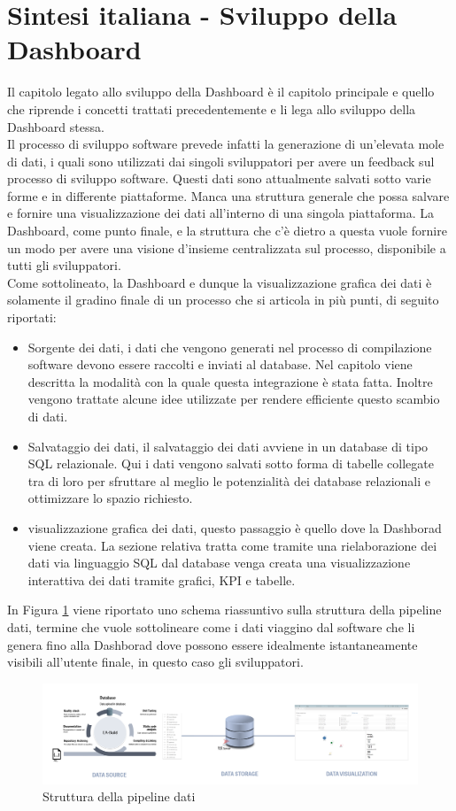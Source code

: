 \documentclass[../main.tex]{subfiles}
\begin{document}
\section{Sintesi italiana - Sviluppo della Dashboard}
Il capitolo legato allo sviluppo della Dashboard è il capitolo principale e quello che riprende i concetti trattati precedentemente  e li lega allo sviluppo della Dashboard stessa.\\
Il processo di sviluppo software prevede infatti la generazione di un'elevata mole di dati, i quali sono utilizzati dai singoli sviluppatori per avere un feedback sul processo di sviluppo software. Questi dati sono attualmente salvati sotto varie forme e in differente piattaforme. Manca una struttura generale che possa salvare e fornire una visualizzazione dei dati all'interno di una singola piattaforma. La Dashboard, come punto finale, e la struttura che c'è dietro a questa vuole fornire un modo per avere una visione d'insieme centralizzata sul processo, disponibile a tutti gli sviluppatori.\\
Come sottolineato, la Dashboard e dunque la visualizzazione grafica dei dati è solamente il gradino finale di un processo che si articola in più punti, di seguito riportati:
\begin{itemize}
    \item Sorgente dei dati, i dati che vengono generati nel processo di compilazione software devono essere raccolti e inviati al database. Nel capitolo viene descritta la modalità con la quale questa integrazione è stata fatta. Inoltre vengono trattate alcune idee utilizzate per rendere efficiente questo scambio di dati.
    \item Salvataggio dei dati, il salvataggio dei dati avviene in un database di tipo \gls{SQL} relazionale. Qui i dati vengono salvati sotto forma di tabelle collegate tra di loro per sfruttare al meglio le potenzialità dei database relazionali e ottimizzare lo spazio richiesto.
    \item visualizzazione grafica dei dati, questo passaggio è quello dove la Dashborad viene creata. La sezione relativa tratta come tramite una rielaborazione dei dati via linguaggio SQL dal database venga creata una visualizzazione interattiva dei dati tramite grafici, \gls{KPI} e tabelle.
\end{itemize}
In Figura \ref{fig:pipelineita} viene riportato uno schema riassuntivo sulla struttura della pipeline dati, termine che vuole sottolineare come i dati viaggino dal software che li genera fino alla Dashborad dove possono essere idealmente istantaneamente visibili all'utente finale, in questo caso gli sviluppatori.
\begin{figure}[h]
    \centering
    \includegraphics[width=\linewidth]{images_folder/pipeline_1.png}
    \caption{Struttura della pipeline dati}
    \label{fig:pipelineita}
\end{figure}
\end{document}
